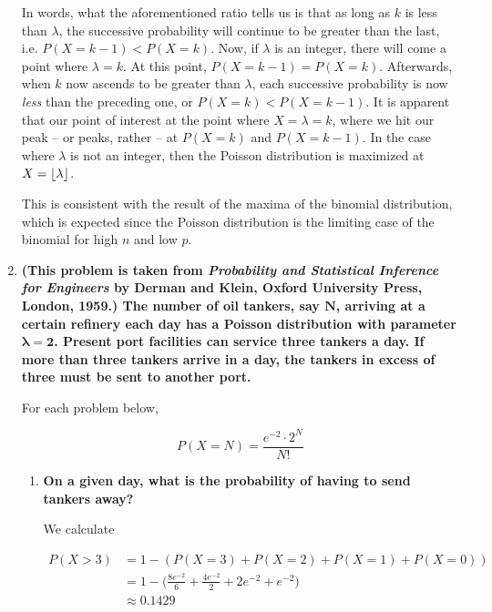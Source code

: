 \documentclass[10pt, oneside]{article}   	%
\theoremstyle{definition}
\DeclarePairedDelimiter\floor{\lfloor}{\rfloor}
\begin{document}
\begin{enumerate}[label=8.\arabic*]
In words, what the aforementioned ratio tells us is that as long as $k$ is less than $\lambda$, the successive probability will continue to be greater than the last, i.e. $P(X = k -1) < P(X = k)$. Now, if $\lambda$ is an integer, there will come a point where $\lambda = k$. At this point, $P(X = k -1) = P(X = k)$. Afterwards, when $k$ now ascends to be greater than $\lambda$, each successive probability is now \textit{less} than the preceding one, or $P(X = k) < P(X = k - 1)$. It is apparent that our point of interest at the point where $\boxed{X = \lambda = k}$, where we hit our peak -- or peaks, rather -- at $P(X = k)$ and $P(X = k - 1)$. In the case where $\lambda$ is not an integer, then the Poisson distribution is maximized at $X = \floor{\lambda}$.

This is consistent with the result of the maxima of the binomial distribution, which is expected since the Poisson distribution is the limiting case of the binomial for high $n$ and low $p$.

\item  \begin{tcolorbox}[
  colback=Cerulean!5!white,
  colframe=Cerulean!75!black]
\textbf{(This problem is taken from \textit{Probability and Statistical Inference for Engineers} by Derman and Klein, Oxford University Press, London, 1959.) The number of oil tankers, say $\bm{N}$, arriving at a certain refinery each day has a Poisson distribution with parameter $\bm{\lambda = 2}$. Present port facilities can service three tankers a day. If more than three tankers arrive in a day, the tankers in excess of three must be sent to another port.}
\end{tcolorbox}

For each problem below,

\[ P(X = N) = \frac{e^{-2} \cdot 2^N}{N!} \]

	\begin{enumerate}
	\item  \begin{tcolorbox}[
	  colback=Cerulean!5!white,
	  colframe=Cerulean!75!black]
	\textbf{On a given day, what is the probability of having to send tankers away?}
	\end{tcolorbox}
	
	We calculate
	
	\begin{align*}
	P(X > 3) &= 1 - (P(X = 3) + P(X = 2) + P(X = 1) + P(X = 0)) \\
	&= 1 - \Big( \frac{8e^{-2}}{6} + \frac{4 e^{-2}}{2} + 2e^{-2} + e^{-2} \Big) \\
	&\approx \boxed{0.1429}
	\end{align*}
	

\end{enumerate}
\end{enumerate}
\end{document}
